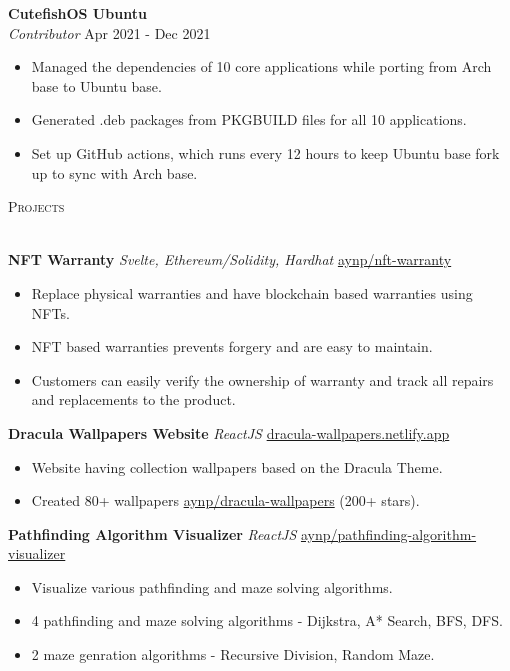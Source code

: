 \documentclass[a4paper]{article}
\newcommand{\lineunder} {
    \vspace*{-8pt} \\
    \hspace*{-18pt} \hrulefill \\
}
\newcommand{\header} [1] {
    {\hspace*{-18pt}\vspace*{6pt} \textsc{#1}}
    \vspace*{-6pt} \lineunder
}
\begin{document}
\textbf{CutefishOS Ubuntu}\\
\textit{Contributor} \hfill Apr 2021 - Dec 2021\\
\begin{itemize}
	\item Managed the dependencies of 10 core applications while porting from Arch base to Ubuntu base.
	\item Generated .deb packages from PKGBUILD files for all 10 applications.
	\item Set up GitHub actions, which runs every 12 hours to keep Ubuntu base fork up to sync with Arch base.
\end{itemize}
\vspace{1.5mm}


\header{Projects}
\vspace{1mm}

{\textbf{NFT Warranty}} {\sl Svelte, Ethereum/Solidity, Hardhat} \hfill \href{https://github.com/aynp/nft-warranty}{aynp/nft-warranty}\\
\begin{itemize}
	\item Replace physical warranties and have blockchain based warranties using NFTs.
	\item NFT based warranties prevents forgery and are easy to maintain.
    \item Customers can easily verify the ownership of warranty and track all repairs and replacements to the product.
\end{itemize}
\vspace*{1.5mm}

{\textbf{Dracula Wallpapers Website}} {\sl ReactJS} \hfill \href{https://dracula-wallpapers.netlify.app/}{dracula-wallpapers.netlify.app}\\
\begin{itemize}
	\item Website having collection wallpapers based on the Dracula Theme.
	\item Created 80+ wallpapers \href{https://github.com/aynp/dracula-wallpapers}{aynp/dracula-wallpapers} (200+ stars).
\end{itemize}
\vspace*{1.5mm}

{\textbf{Pathfinding Algorithm Visualizer}} {\sl ReactJS} \hfill \href{https://github.com/aynp/pathfinding-algorithm-visualizer}{aynp/pathfinding-algorithm-visualizer}\\
\begin{itemize}
	\item Visualize various pathfinding and maze solving algorithms.
	\item 4 pathfinding and maze solving algorithms - Dijkstra, A* Search, BFS, DFS.
	\item 2 maze genration algorithms - Recursive Division, Random Maze.
\end{itemize}
\vspace*{1.5mm}
\end{document}
